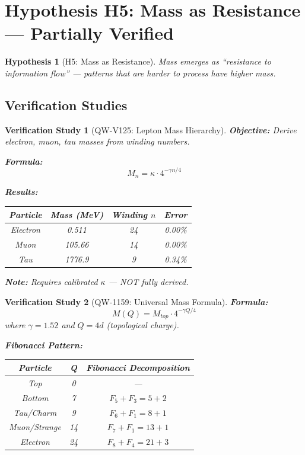 \documentclass[11pt, a4paper]{article}
\newtheorem{hypothesis}{Hypothesis}[section]
\newtheorem{verification}{Verification Study}[section]
\theoremstyle{remark}
\begin{document}
\section{Hypothesis H5: Mass as Resistance --- Partially Verified}

\begin{hypothesis}[H5: Mass as Resistance]
Mass emerges as ``resistance to information flow'' --- patterns that are harder to process have higher mass.
\end{hypothesis}

\subsection{Verification Studies}

\begin{verification}[QW-V125: Lepton Mass Hierarchy]
\textbf{Objective:} Derive electron, muon, tau masses from winding numbers.

\textbf{Formula:}
\begin{equation}
M_n = \kappa \cdot 4^{-\gamma n/4}
\end{equation}

\textbf{Results:}
\begin{center}
\begin{tabular}{|c|c|c|c|}
\hline
Particle & Mass (MeV) & Winding $n$ & Error \\
\hline
Electron & 0.511 & 24 & 0.00\% \\
Muon & 105.66 & 14 & 0.00\% \\
Tau & 1776.9 & 9 & 0.34\% \\
\hline
\end{tabular}
\end{center}

\textbf{Note:} Requires calibrated $\kappa$ --- NOT fully derived.
\end{verification}

\begin{verification}[QW-1159: Universal Mass Formula]
\textbf{Formula:}
\begin{equation}
\boxed{M(Q) = M_{top} \cdot 4^{-\gamma Q/4}}
\end{equation}
where $\gamma = 1.52$ and $Q = 4d$ (topological charge).

\textbf{Fibonacci Pattern:}
\begin{center}
\begin{tabular}{|c|c|c|}
\hline
Particle & Q & Fibonacci Decomposition \\
\hline
Top & 0 & --- \\
Bottom & 7 & $F_5 + F_3 = 5 + 2$ \\
Tau/Charm & 9 & $F_6 + F_1 = 8 + 1$ \\
Muon/Strange & 14 & $F_7 + F_1 = 13 + 1$ \\
Electron & 24 & $F_8 + F_4 = 21 + 3$ \\
\hline
\end{tabular}
\end{center}
\end{verification}
\end{document}
